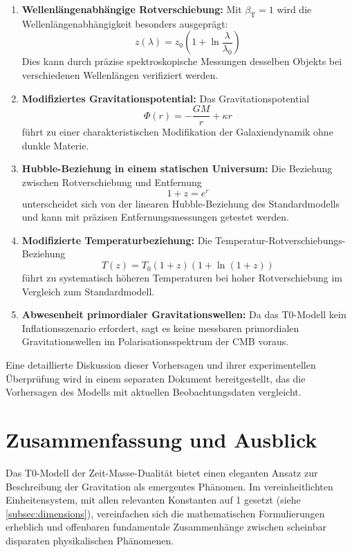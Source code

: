 \documentclass[12pt,a4paper]{article}
\newcommand{\betaT}{\beta_{\text{T}}}
\begin{document}
	\begin{enumerate}
		\item \textbf{Wellenlängenabhängige Rotverschiebung:} Mit \(\betaT = 1\) wird die Wellenlängenabhängigkeit besonders ausgeprägt:
		\begin{equation}
			z(\lambda) = z_0 \left(1 + \ln \frac{\lambda}{\lambda_0}\right)
		\end{equation}
		Dies kann durch präzise spektroskopische Messungen desselben Objekts bei verschiedenen Wellenlängen verifiziert werden.
		
		\item \textbf{Modifiziertes Gravitationspotential:} Das Gravitationspotential 
		\begin{equation}
			\Phi(r) = -\frac{GM}{r} + \kappa r
		\end{equation}
		führt zu einer charakteristischen Modifikation der Galaxiendynamik ohne dunkle Materie.
		
		\item \textbf{Hubble-Beziehung in einem statischen Universum:} Die Beziehung zwischen Rotverschiebung und Entfernung
		\begin{equation}
			1 + z = e^{r}
		\end{equation}
		unterscheidet sich von der linearen Hubble-Beziehung des Standardmodells und kann mit präzisen Entfernungsmessungen getestet werden.
		
		\item \textbf{Modifizierte Temperaturbeziehung:} Die Temperatur-Rotverschiebungs-Beziehung
		\begin{equation}
			T(z) = T_0 (1+z)(1 + \ln(1+z))
		\end{equation}
		führt zu systematisch höheren Temperaturen bei hoher Rotverschiebung im Vergleich zum Standardmodell.
		
		\item \textbf{Abwesenheit primordialer Gravitationswellen:} Da das T0-Modell kein Inflationsszenario erfordert, sagt es keine messbaren primordialen Gravitationswellen im Polarisationsspektrum der CMB voraus.
	\end{enumerate}
	
	Eine detaillierte Diskussion dieser Vorhersagen und ihrer experimentellen Überprüfung wird in einem separaten Dokument bereitgestellt, das die Vorhersagen des Modells mit aktuellen Beobachtungsdaten vergleicht.
	
	\section{Zusammenfassung und Ausblick}
	\label{sec:summary}
	Das T0-Modell der Zeit-Masse-Dualität bietet einen eleganten Ansatz zur Beschreibung der Gravitation als emergentes Phänomen. Im vereinheitlichten Einheitensystem, mit allen relevanten Konstanten auf 1 gesetzt (siehe \cref{subsec:dimensions}), vereinfachen sich die mathematischen Formulierungen erheblich und offenbaren fundamentale Zusammenhänge zwischen scheinbar disparaten physikalischen Phänomenen.
	
\end{document}
